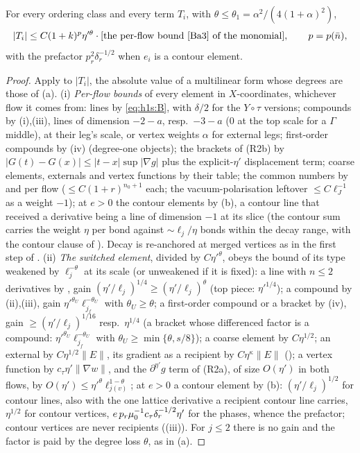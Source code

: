 \begin{lemma}\label{rot:h1s:T}
For every ordering class and every term $T_i$, with $\theta\le\theta_1=\alpha^2/(4(1+\alpha)^2)$,
\[
|T_i|\le C(1+k)^p\eta'^\theta\cdot[\text{the per-flow bound \cite[(1.33)]{Ba3} of the monomial}],\qquad p=p(\bar n),
\]
with the prefactor $p_r^2\delta_r^{-1/2}$ when $e_i$ is a contour element.
\end{lemma}
\begin{proof}
Apply  to $|T_i|$, the absolute value of a multilinear form whose degrees are those of (a).
(i) \emph{Per-flow bounds} of every element in $X$-coordinates, whichever flow it comes from: lines by \eqref{eq:h1s:B}, with $\delta/2$ for the $Y\circ\tau$ versions; compounds by (i),(iii), lines of dimension $-2-a$, resp.\ $-3-a$ ($0$ at the top scale for a $\Gamma$ middle), at their leg's scale, or vertex weights $\alpha$ for external legs; first-order compounds by (iv) (degree-one objects); the brackets of (R2b) by $|G(t)-G(x)|\le|t-x|\sup|\nabla g|$ plus the explicit-$\eta'$ displacement term; coarse elements, externals and vertex functions by their table; the common numbers by  and  per flow ($\le C(1+r)^{n_0+1}$ each; the vacuum-polarisation leftover $\le C\ell_J^{-1}$ as a weight $-1$); at $e>0$ the contour elements by (b), a contour line that received a derivative being a line of dimension $-1$ at its slice (the contour sum carries the weight $\eta$ per bond against $\sim\ell_j/\eta$ bonds within the decay range, \cite[(3.63)--(3.64)]{K1} with the contour clause of \cite[Prop.~3.7]{K1}). Decay is re-anchored at merged vertices as in the first step of .
(ii) \emph{The switched element}, divided by $C\eta'^\theta$, obeys the bound of its type weakened by $\ell_j^{-\theta}$ at its scale (or unweakened if it is fixed): a line with $n\le2$ derivatives by , gain $(\eta'/\ell_j)^{1/4}\ge(\eta'/\ell_j)^\theta$ (top piece: $\eta'^{1/4}$); a compound by (ii),(iii), gain $\eta'^{\theta_U}\ell_{j_f}^{-\theta_U}$ with $\theta_U\ge\theta$; a first-order compound or a bracket by (iv), gain $\ge(\eta'/\ell_j)^{1/16}$ resp.\ $\eta^{1/4}$ (a bracket whose differenced factor is a compound: $\eta'^{\theta_U}\ell_{j_f}^{-\theta_U}$ with $\theta_U\ge\min\{\theta,s/8\}$); a coarse element by $C\eta^{1/2}$; an external by $C\eta^{1/2}\|E\|$, its gradient as a recipient by $C\eta^\kappa\|E\|$ (); a vertex function by $c_\tau\eta'\|\nabla w\|$, and the $\partial^{\eta'}g$ term of (R2a), of size $O(\eta')$ in both flows, by $O(\eta')\le\eta'^\theta\ell_{j(v)}^{1-\theta}$; at $e>0$ a contour element by (b): $(\eta'/\ell_j)^{1/2}$ for contour lines, also with the one lattice derivative a recipient contour line carries, $\eta^{1/2}$ for contour vertices, $e\,p_r\mu_0^{-1}c_\tau\delta_r^{-1/2}\eta'$ for the phases, whence the prefactor; contour vertices are never recipients ((iii)). For $j\le2$ there is no gain and the factor is paid by the degree loss $\theta$, as in (a).

\end{proof}
